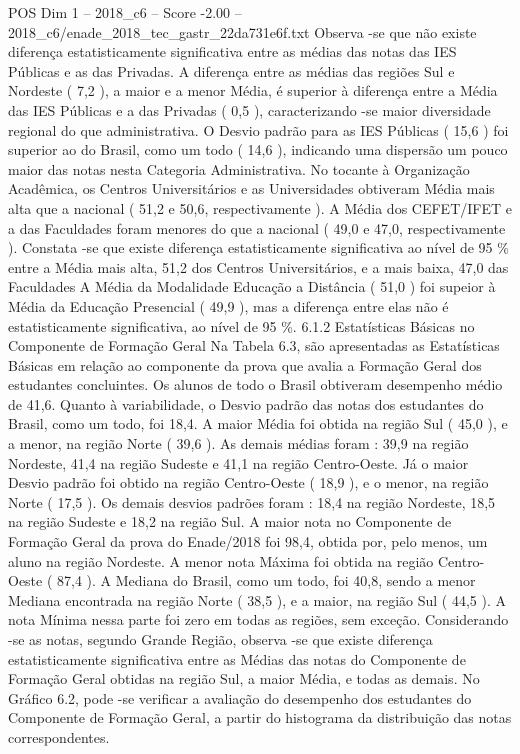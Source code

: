 \begin{textsample}{POS Dim 1 – 2018\_c6 – Score -2.00 – 2018\_c6/enade\_2018\_tec\_gastr\_22da731e6f.txt}
Observa -se que não existe diferença estatisticamente significativa entre as médias das notas das IES Públicas e as das Privadas.
A diferença entre as médias das regiões Sul e Nordeste ( 7,2 ), a maior e a menor Média, é superior à diferença entre a Média das IES Públicas e a das Privadas ( 0,5 ), caracterizando -se maior diversidade regional do que administrativa.
O Desvio padrão para as IES Públicas ( 15,6 ) foi superior ao do Brasil, como um todo ( 14,6 ), indicando uma dispersão um pouco maior das notas nesta Categoria Administrativa.
No tocante à Organização Acadêmica, os Centros Universitários e as Universidades obtiveram Média mais alta que a nacional ( 51,2 e 50,6, respectivamente ).
A Média dos CEFET/IFET e a das Faculdades foram menores do que a nacional ( 49,0 e 47,0, respectivamente ).
Constata -se que existe diferença estatisticamente significativa ao nível de 95 \% entre a Média mais alta, 51,2 dos Centros Universitários, e a mais baixa, 47,0 das Faculdades A Média da Modalidade Educação a Distância ( 51,0 ) foi supeior à Média da Educação Presencial ( 49,9 ), mas a diferença entre elas não é estatisticamente significativa, ao nível de 95 \%. 6.1.2 Estatísticas Básicas no Componente de Formação Geral Na Tabela 6.3, são apresentadas as Estatísticas Básicas em relação ao componente da prova que avalia a Formação Geral dos estudantes concluintes.
Os alunos de todo o Brasil obtiveram desempenho médio de 41,6.
Quanto à variabilidade, o Desvio padrão das notas dos estudantes do Brasil, como um todo, foi 18,4.
A maior Média foi obtida na região Sul ( 45,0 ), e a menor, na região Norte ( 39,6 ).
As demais médias foram : 39,9 na região Nordeste, 41,4 na região Sudeste e 41,1 na região Centro-Oeste.
Já o maior Desvio padrão foi obtido na região Centro-Oeste ( 18,9 ), e o menor, na região Norte ( 17,5 ).
Os demais desvios padrões foram : 18,4 na região Nordeste, 18,5 na região Sudeste e 18,2 na região Sul.
A maior nota no Componente de Formação Geral da prova do Enade/2018 foi 98,4, obtida por, pelo menos, um aluno na região Nordeste.
A menor nota Máxima foi obtida na região Centro-Oeste ( 87,4 ).
A Mediana do Brasil, como um todo, foi 40,8, sendo a menor Mediana encontrada na região Norte ( 38,5 ), e a maior, na região Sul ( 44,5 ).
A nota Mínima nessa parte foi zero em todas as regiões, sem exceção.
Considerando -se as notas, segundo Grande Região, observa -se que existe diferença estatisticamente significativa entre as Médias das notas do Componente de Formação Geral obtidas na região Sul, a maior Média, e todas as demais.
No Gráfico 6.2, pode -se verificar a avaliação do desempenho dos estudantes do Componente de Formação Geral, a partir do histograma da distribuição das notas correspondentes.

\end{textsample}

